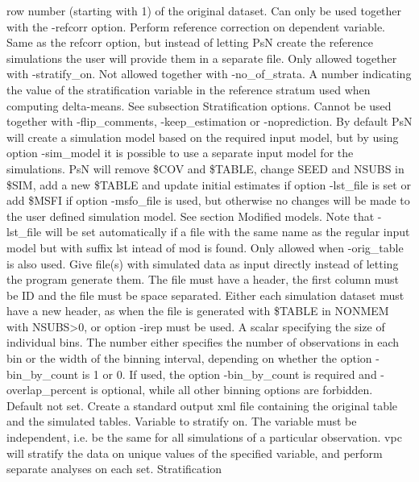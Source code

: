 \begin{optionlist}
row number (starting with 1) of the original dataset. Can only be used together with the -refcorr
option.
\nextopt
{}
Perform reference correction on dependent variable. Same as the refcorr option, but instead
of letting PsN create the reference simulations the user will provide them in a separate file.
\nextopt
{}
Only allowed together with -stratify\_on. Not allowed together with -no\_of\_strata.
A number indicating the value of the stratification variable in the reference stratum used when computing delta-means.
See subsection Stratification options.  
\nextopt
{}
Cannot be used together with -flip\_comments, \mbox{-keep\_estimation} or -noprediction. By default PsN will create a simulation model based on the  required input model, but by using option -sim\_model it is possible to use a separate input model for the simulations. PsN will remove \$COV and \mbox{\$TABLE}, change SEED and NSUBS in \$SIM, add a new \mbox{\$TABLE} and  update initial estimates if option -lst\_file is set or add \$MSFI if option -msfo\_file is used, but otherwise no changes will be made to the user defined simulation model. See section Modified models. Note that -lst\_file will be set automatically if a file with the same name as the regular input model but with suffix lst intead of mod is found. 
\nextopt
{}
Only allowed when -orig\_table is also used. Give file(s) with simulated data as input directly instead of letting the program generate them.  The file must have a header, the first column must be ID and the file must be space separated. 
Either each simulation dataset must have a new header, as when the file is generated with \$TABLE in NONMEM with NSUBS>0, or option -irep must be used.
\nextopt
{}
A scalar specifying the size of individual bins. The number either specifies the number of observations in each bin or the width of the binning interval, depending on whether the option -bin\_by\_count is 1 or 0. If used, the option -bin\_by\_count is required and -overlap\_percent is optional,
while all other binning options are forbidden.
\nextopt
{}
Default not set. Create a standard output xml file containing the original table and the simulated tables.
\nextopt
{}
Variable to stratify on. The variable must be independent, i.e. be the same for all simulations of a particular observation.
vpc will stratify the data on unique values of the specified variable, and perform separate analyses on each set. Stratification 

\end{optionlist}
